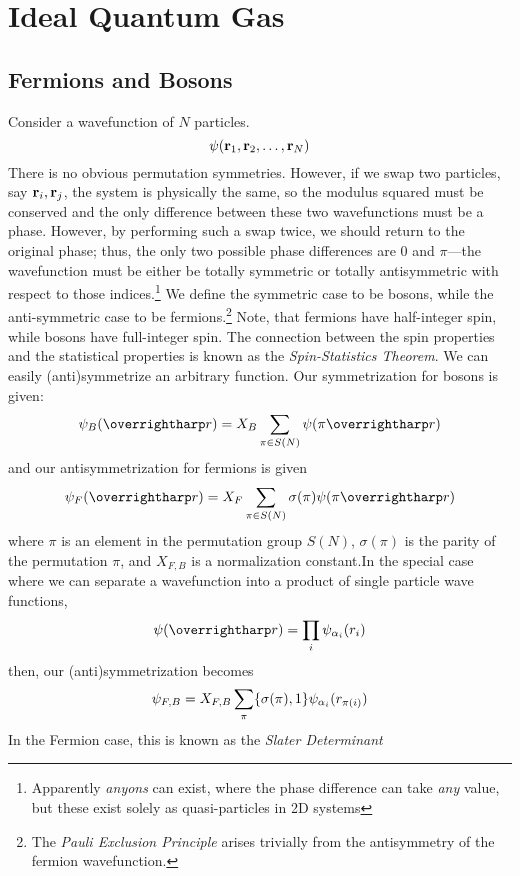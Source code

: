 \chapter{Ideal Quantum Gas}
\section{Fermions and Bosons}
Consider a wavefunction of \(N\) particles. 
\[\psi(\mathbf{r}_1, \mathbf{r}_2, \dots, \mathbf{r}_N)\]
There is no obvious permutation symmetries. However, if we swap two particles, say \(\mathbf{r}_i, \mathbf{r}_j\), the system is physically the same, so the modulus squared must be conserved and the only difference between these two wavefunctions must be a phase. However, by performing such a swap twice, we should return to the original phase; thus, the only two possible phase differences are \(0\) and \(\pi\)---the wavefunction must be either be totally symmetric or totally antisymmetric with respect to those indices.\footnote{Apparently \emph{anyons} can exist, where the phase difference can take \emph{any} value, but these exist solely as quasi-particles in 2D systems} We define the symmetric case to be bosons, while the anti-symmetric case to be fermions.\footnote{The \emph{Pauli Exclusion Principle} arises trivially from the antisymmetry of the fermion wavefunction.} Note, that fermions have half-integer spin, while bosons have full-integer spin. The connection between the spin properties and the statistical properties is known as the \emph{Spin-Statistics Theorem}. We can easily  (anti)symmetrize an arbitrary function. Our symmetrization for bosons is given:
\[\p_B(\vv r) = X_{B}\sum_{\pi\in S(N)}\p(\pi \vv r)\]
and our antisymmetrization for fermions is given
\[\p_F(\vv r) = X_F\sum_{\pi\in S(N)} \sigma(\pi)\p(\pi \vv r)\]
where \(\pi\) is an element in the permutation group \(S(N)\), \(\sigma(\pi)\) is the parity of the permutation \(\pi\), and \(X_{F,B}\) is a normalization constant.In the special case where we can separate a wavefunction into a product of single particle wave functions,
\[\p(\vv r) = \prod_i \p_{\alpha_i}(r_i)\]
then, our (anti)symmetrization becomes
\[\psi_{F,B} = X_{F,B}\sum_\pi \{\sigma(\pi),1\}\psi_{\alpha_i}(r_{\pi(i)})\]
In the Fermion case, this is known as the \emph{Slater Determinant}

